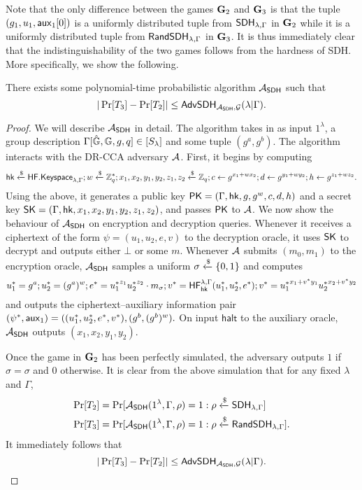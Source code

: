 Note that the only difference between the games $\mathbf{G}_2$ and $\mathbf{G}_3$ is that the tuple $(g_1, u_1, \mathsf{aux}_1[0])$ is a uniformly distributed tuple from $\mathsf{SDH}_{\lambda,\Gamma}$ in $\mathbf{G}_2$ while it is a uniformly distributed tuple from $\mathsf{RandSDH}_{\lambda,\Gamma}$ in $\mathbf{G}_3$. It is thus immediately clear that the indistinguishability of the two games follows from the hardness of SDH. More specifically, we show the following.

\begin{lemma}
	\label{lem:sdh-game}
	There exists some polynomial-time probabilistic algorithm $\mathcal{A}_\mathsf{SDH}$ such that $$|\Pr[T_3]-\Pr[T_2]|\leq\mathsf{AdvSDH}_{\mathcal{A}_\mathsf{SDH}, \mathcal{G}}(\lambda|\Gamma).$$
\end{lemma}
\begin{proof}
	We will describe $\mathcal{A}_\mathsf{SDH}$ in detail. The algorithm takes in as input $1^\lambda$, a group description $\Gamma[\hat{\mathbb{G}},\mathbb{G},g,q]\in[S_\lambda]$ and some tuple $(g^a, g^{b})$. The algorithm interacts with the DR-CCA adversary $\mathcal{A}$. First, it begins by computing
	$$\mathsf{hk}\xleftarrow{\$}\mathsf{HF.Keyspace}_{\lambda, \Gamma}; w\xleftarrow{\$}\mathbb{Z}^{*}_q; x_1,x_2,y_1,y_2,z_1,z_2\xleftarrow{\$}\mathbb{Z}_q; c\gets g^{x_1+wx_2}; d\gets g^{y_1+wy_2}; h\gets g^{z_1+wz_2}.$$
	Using the above, it generates a public key $\mathsf{PK} = (\Gamma, \mathsf{hk}, g,g^w, c, d, h)$ and a secret key $\mathsf{SK} = (\Gamma,\mathsf{hk},x_1,x_2,y_1,y_2,z_1,z_2)$, and passes $\mathsf{PK}$ to $\mathcal{A}$. We now show the behaviour of $\mathcal{A}_\mathsf{SDH}$ on encryption and decryption queries. Whenever it receives a ciphertext of the form $\psi = (u_1,u_2,e,v)$ to the decryption oracle, it uses $\mathsf{SK}$ to decrypt and outputs either $\bot$ or some $m$. Whenever $\mathcal{A}$ submits $(m_0,m_1)$ to the encryption oracle, $\mathcal{A}_\mathsf{SDH}$ samples a uniform $\sigma\xleftarrow{\$}\{0,1\}$ and computes
	$$u_1^{*} = g^a; u_2^{*} = (g^a)^w; e^{*} = {u_1^{*}}^{z_1}{u_2^{*}}^{z_2}\cdot m_\sigma; v^{*} =\mathsf{HF}_{\mathsf{hk}}^{\lambda,\Gamma}(u_1^{*},u_2^{*},e^{*}); v^{*} = {u_1^{*}}^{x_1+v^{*}y_1}{u_2^{*}}^{x_2+v^{*}y_2}$$ and outputs the ciphertext--auxiliary information pair $(\psi^{*},\mathsf{aux}_1) = ((u_1^{*},u_2^{*},e^{*},v^{*}), (g^{b}, (g^{b})^w).$ On input $\mathsf{halt}$ to the auxiliary oracle, $\mathcal{A}_\mathsf{SDH}$ outputs $(x_1,x_2,y_1,y_2)$.
	
	Once the game in $\mathbf{G}_2$ has been perfectly simulated, the adversary outputs $1$ if $\hat{\sigma} = \sigma$ and $0$ otherwise. It is clear from the above simulation that for any fixed $\lambda$ and $\Gamma$, 
	\begin{align*}
		\Pr[T_2] &= \Pr[\mathcal{A}_\mathsf{SDH}(1^\lambda,\Gamma,\rho) = 1 : \rho\xleftarrow{\$}\mathsf{SDH}_{\lambda,\Gamma}]\\
		\Pr[T_3] &= \Pr[\mathcal{A}_\mathsf{SDH}(1^\lambda,\Gamma,\rho) = 1 : \rho\xleftarrow{\$}\mathsf{RandSDH}_{\lambda,\Gamma}].
	\end{align*}
	It immediately follows that 
	$$|\Pr[T_3]-\Pr[T_2]|\leq\mathsf{AdvSDH}_{\mathcal{A}_\mathsf{SDH}, \mathcal{G}}(\lambda|\Gamma).$$
\end{proof}

